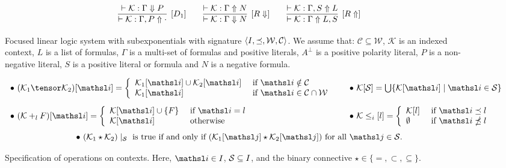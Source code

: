 \begin{figure}[t]
$$$$
\vspace{-2.5mm}
$$
\infer[\text{[$D_1$]}]{\vdash \mathcal{K} : \Gamma, P \Uparrow
\cdot}{\vdash \mathcal{K} : \Gamma \Downarrow P}
\qquad
\infer[\text{[$R\Downarrow$]}]{\vdash \mathcal{K} : \Gamma \Downarrow
N}{\vdash \mathcal{K} : \Gamma \Uparrow N}
\qquad
\infer[\text{[$R\Uparrow$]}]{\vdash \mathcal{K} : \Gamma \Uparrow L,
S}{\vdash \mathcal{K} : \Gamma, S \Uparrow L}
$$
\caption{Focused linear logic system with subexponentials with signature
$\langle I, \preceq, {\cal W},{\cal C}\rangle$. We assume that: $\mathcal{C} \subseteq
\mathcal{W}$, $\mathcal{K}$ is an indexed context, $L$ is a list of formulas, $\Gamma$ is a multi-set of
formulas and positive literals, $A^\bot$ is a positive polarity literal,
$P$ is a non-negative literal, $S$ is a positive literal or formula and $N$
is a negative formula.}
\label{figure:sellf}
\vspace{-5mm}
\end{figure}

\begin{figure}[t]
\[
\begin{array}{l@{\qquad}l}
\bullet~(\mathcal{K}_1 \tensor \mathcal{K}_2) [\tsl{i}] = \left\{
\begin{array}{ll}
 \mathcal{K}_1[\tsl{i}] \cup \mathcal{K}_2[\tsl{i}] & \hbox{ if }
\tsl{i} \notin
\qc\\
 \mathcal{K}_1[\tsl{i}]  & \hbox{ if } \tsl{i} \in \qc \cap \qw
\end{array}
\right.
& 
\bullet~\mathcal{K}[\mathcal{S}] =
\bigcup\{\mathcal{K}[\tsl{i}]\;|\;\tsl{i}\in \mathcal{S}\}\\[15pt]
\bullet~(\mathcal{K} +_l F) [\tsl{i}] = \left\{
\begin{array}{ll}
 \mathcal{K}[\tsl{i}] \cup \{F\} & \hbox{ if } \tsl{i} = l\\
 \mathcal{K}[\tsl{i}]  & \hbox{ otherwise }
\end{array}
\right.
&
\bullet~ \mathcal{K} \leq_i[l] = \left\{
\begin{array}{ll}
 \mathcal{K}[l] & \hbox{ if } \tsl{i} \preceq l\\
 \emptyset & \hbox{ if } \tsl{i} \npreceq l 
\end{array}
\right.
\end{array}
\]
\[
\bullet~ (\mathcal{K}_1 \star \mathcal{K}_2)\mid_\mathcal{S}
\textrm{ is true if and only if }(\mathcal{K}_1[\tsl{j}]
\star \mathcal{K}_2[\tsl{j}]) \textrm{ for all $\tsl{j} \in \Sscr$.}
\]
\caption{Specification of operations on contexts. Here, 
$\tsl{i} \in I$, ${\cal S} \subseteq I$, and the 
binary connective $\star \in \{=, \subset, \subseteq\}$.}
\label{Fig:Contexts}
\vspace{-5mm}
\end{figure}

